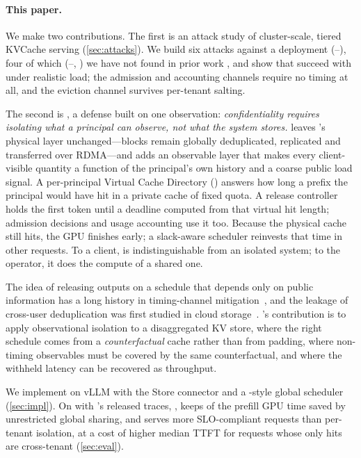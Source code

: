 \paragraph{This paper.} We make two contributions. The first is an attack study of
cluster-scale, tiered KVCache serving (\cref{sec:attacks}). We build six attacks
against a \mc deployment (--), four of which (--, ) we have not
found in prior work , and show that  succeed with  under
realistic load; the admission and accounting channels require no timing at all,
and the eviction channel survives per-tenant salting.

The second is \sys, a defense built on one observation: \emph{confidentiality
requires isolating what a principal can observe, not what the system stores.}
\sys leaves \mc's physical layer unchanged---blocks remain globally deduplicated,
replicated and transferred over RDMA---and adds an observable layer that makes
every client-visible quantity a function of the principal's own history and a
coarse public load signal. A per-principal Virtual Cache Directory (\vcd)
answers how long a prefix the principal would have hit in a private cache of
fixed quota. A release controller holds the first token until a deadline
computed from that virtual hit length; admission decisions and usage accounting
use it too. Because the physical cache still hits, the GPU finishes early; a
slack-aware scheduler reinvests that time in other requests. To a client, \sys
is indistinguishable from an isolated system; to the operator, it does the
compute of a shared one.

The idea of releasing outputs on a schedule that depends only on public
information has a long history in timing-channel
mitigation~\cite{askarov2010predictive,zhang2011predictive}, and the leakage of
cross-user deduplication was first studied in cloud
storage~\cite{harnik2010dedup}. \sys's contribution is to apply observational
isolation to a disaggregated KV store, where the right schedule comes from a
\emph{counterfactual} cache rather than from padding, where non-timing
observables must be covered by the same counterfactual, and where the withheld
latency can be recovered as throughput.

We implement \sys on vLLM with the \mc Store connector and a \mc-style global
scheduler (\cref{sec:impl}). On  with \mc's released traces,
\sys {}, keeps
 of the prefill GPU time saved by unrestricted global sharing,
and serves  more SLO-compliant requests than per-tenant isolation, at a
cost of  higher median TTFT for requests whose only hits are
cross-tenant (\cref{sec:eval}).

